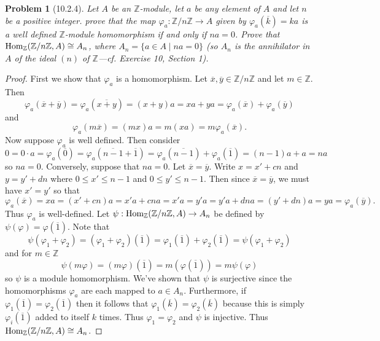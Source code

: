 \documentclass{article}
\newcommand{\Hom}{\textup{Hom}}
\newtheorem{problem}{Problem}
\begin{document}
\begin{problem}[10.2.4]
Let $A$ be an $\mathbb{Z}$-module, let $a$ be any element of $A$ and let $n$ be a positive integer. prove that the map $\varphi_a : \mathbb{Z}/n\mathbb{Z} \to A$ given by $\varphi_a(\overline{k}) = ka$ is a well defined $\mathbb{Z}$-module homomorphism if and only if $na = 0$. Prove that $\Hom_{\mathbb{Z}}(\mathbb{Z}/n\mathbb{Z}, A) \cong A_n$, where $A_n = \{a \in A \mid na = 0\}$ (so $A_n$ is the annihilator in $A$ of the ideal $(n)$ of $\mathbb{Z}$---cf. Exercise 10, Section 1).
\end{problem}
\begin{proof}
First we show that $\varphi_a$ is a homomorphism. Let $\overline{x}, \overline{y} \in \mathbb{Z}/n\mathbb{Z}$ and let $m \in \mathbb{Z}$. Then
\[
\varphi_a(\overline{x} + \overline{y}) = \varphi_a(\overline{x+y}) = (x+y)a = xa + ya = \varphi_a(\overline{x}) + \varphi_a(\overline{y})
\]
and
\[
\varphi_a(m\overline{x}) = (mx)a = m(xa) = m\varphi_a(\overline{x}).
\]
Now suppose $\varphi_a$ is well defined. Then consider
\[
0 = 0 \cdot a = \varphi_a(\overline{0}) = \varphi_a(\overline{n-1} + \overline{1}) = \varphi_a(\overline{n-1}) + \varphi_a(\overline{1}) = (n-1)a + a = na
\]
so $na = 0$. Conversely, suppose that $na = 0$. Let $\overline{x} = \overline{y}$. Write $x = x' + cn$ and $y = y' + dn$ where $0 \leq x' \leq n-1$ and $0 \leq y' \leq n-1$. Then since $\overline{x} = \overline{y}$, we must have $x' = y'$ so that
\[
\varphi_a(\overline{x}) = xa = (x' + cn)a = x'a + cna = x'a = y'a = y'a + dna = (y'+dn)a = ya = \varphi_a(\overline{y}).
\]
Thus $\varphi_a$ is well-defined. Let $\psi : \Hom_{\mathbb{Z}}(\mathbb{Z}/n\mathbb{Z},A) \to A_n$ be defined by $\psi(\varphi) = \varphi(\overline{1})$. Note that
\[
\psi(\varphi_1 + \varphi_2) = (\varphi_1 + \varphi_2)(\overline{1}) = \varphi_1(\overline{1}) + \varphi_2(\overline{1}) = \psi(\varphi_1 + \varphi_2)
\]
and for $m \in \mathbb{Z}$
\[
\psi(m\varphi) = (m\varphi)(\overline{1}) = m(\varphi(\overline{1})) = m\psi(\varphi)
\]
so $\psi$ is a module homomorphism. We've shown that $\psi$ is surjective since the homomorphisms $\varphi_a$ are each mapped to $a \in A_n$. Furthermore, if $\varphi_1(\overline{1}) = \varphi_2(\overline{1})$ then it follows that $\varphi_1(\overline{k}) = \varphi_2(\overline{k})$ because this is simply $\varphi_i(\overline{1})$ added to itself $k$ times. Thus $\varphi_1 = \varphi_2$ and $\psi$ is injective. Thus $\Hom_{\mathbb{Z}}(\mathbb{Z}/n\mathbb{Z}, A) \cong A_n$.
\end{proof}
\end{document}

